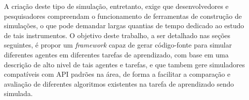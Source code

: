 \documentclass[cic,tc]{iiufrgs}
\newcommand\bruno[1]{\textcolor{magenta}{#1}}
\begin{document}
    
    A criação deste tipo de simulação, entretanto, exige que desenvolvedores e pesquisadores compreendam o funcionamento de ferramentas de construção
    de simulações, o que pode demandar largas quantias de tempo dedicado ao estudo de tais instrumentos. O objetivo deste trabalho, a ser detalhado
    nas seções seguintes, é propor um \textit{framework} capaz de gerar código-fonte para simular diferentes agentes em diferentes tarefas de aprendizado,
    com base em uma descrição de alto nivel de tais agentes e tarefas, e que tambem gere simuladores compatíveis com API padrões na área, de forma a facilitar
    a comparação e avaliação de diferentes algoritmos existentes na tarefa de aprendizado sendo simulada.
    
\end{document}
